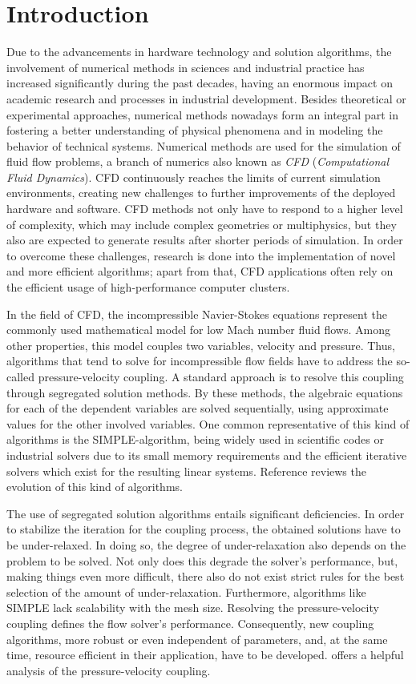 \chapter{Introduction}

Due to the advancements in hardware technology and solution algorithms, the involvement of numerical methods in sciences and industrial practice has increased significantly during the past decades, having an enormous impact on academic research and processes in industrial development. Besides theoretical or experimental approaches, numerical methods nowadays form an integral part in fostering a better understanding of physical phenomena and in modeling the behavior of technical systems. Numerical methods are used for the simulation of fluid flow problems, a branch of numerics also known as \emph{CFD} (\emph{Computational Fluid Dynamics}). CFD continuously reaches the limits of current simulation environments, creating new challenges to further improvements of the deployed hardware and software. CFD methods not only have to respond to a higher level of complexity, which may include complex geometries or multiphysics, but they also are expected to generate results after shorter periods of simulation. In order to overcome these challenges, research is done into the implementation of novel and more efficient algorithms; apart from that, CFD applications often rely on the efficient usage of high-performance computer clusters. 

In the field of CFD, the incompressible Navier-Stokes equations represent the commonly used mathematical model for low Mach number fluid flows. Among other properties, this model couples two variables, velocity and pressure. Thus, algorithms that tend to solve for incompressible flow fields have to address the so-called pressure-velocity coupling. A standard approach is to resolve this coupling through segregated solution methods. By these methods, the algebraic equations for each of the dependent variables are solved sequentially, using approximate values for the other involved variables. One common representative of this kind of algorithms is the SIMPLE-algorithm, being widely used in scientific codes or industrial solvers due to its small memory requirements and the efficient iterative solvers which exist for the resulting linear systems. Reference \cite{acharya07} reviews the evolution of this kind of algorithms.

The use of segregated solution algorithms entails significant deficiencies. In order to stabilize the iteration for the coupling process, the obtained solutions have to be under-relaxed. In doing so, the degree of under-relaxation also depends on the problem to be solved. Not only does this degrade the solver's performance, but, making things even more difficult, there also do not exist strict rules for the best selection of the amount of under-relaxation. Furthermore, algorithms like SIMPLE lack scalability with the mesh size. Resolving the pressure-velocity coupling defines the flow solver's performance. Consequently, new coupling algorithms, more robust or even independent of parameters, and, at the same time, resource efficient in their application, have to be developed. \cite{peric90} offers a helpful analysis of the pressure-velocity coupling.

